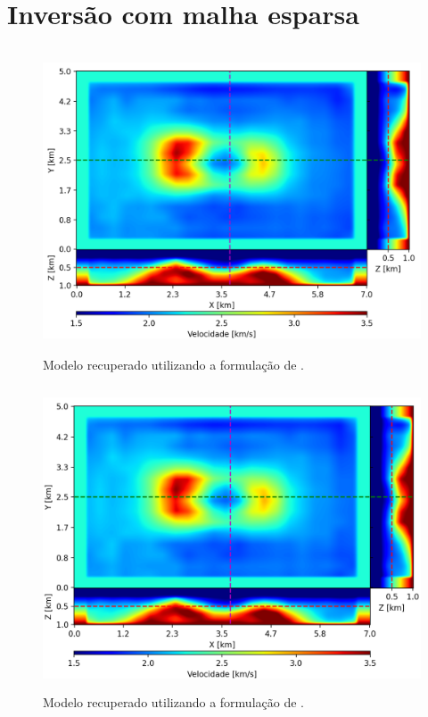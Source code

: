 \section{Inversão com malha esparsa}



\begin{figure}[H]
	\centering
	\includegraphics[width=12cm,height=9cm]{Imgs/Resultados/pod_sparse.png}
	\caption{Modelo recuperado utilizando a formulação de .}
	\label{fig:pod_sparse}	
\end{figure}


\begin{figure}[H]
	\centering
	\includegraphics[width=12cm,height=9cm]{Imgs/Resultados/fim_sparse.png}
	\caption{Modelo recuperado utilizando a formulação de .}
	\label{fig:fim_sparse}	
\end{figure}


